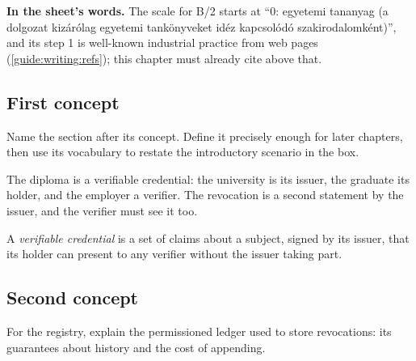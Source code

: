 \textbf{In the sheet's words.} The scale for B/2 starts at \enquote{0: egyetemi tananyag (a dolgozat kizárólag egyetemi tankönyveket idéz kapcsolódó szakirodalomként)}, and its step 1 is well-known industrial practice from web pages (\cref{guide:writing:refs}); this chapter must already cite above that.

\subsection[First concept]{First concept\skimmark}\label{guide:chapters:first-concept}
Name the section after its concept. Define it precisely enough for later chapters, then use its vocabulary to restate the introductory scenario in the box.
\begin{runningexample}
The diploma is a verifiable credential: the university is its \gls{issuer}, the graduate its \gls{holder}, and the employer a \gls{verifier}. The revocation is a second statement by the issuer, and the verifier must see it too.
\end{runningexample}
\begin{definition}\label{guide:def:vc}
A \emph{verifiable credential} is a set of claims about a subject, signed by its issuer, that its holder can present to any verifier without the issuer taking part.
\end{definition}

\subsection{Second concept}\label{guide:chapters:second-concept}
For the registry, explain the permissioned ledger used to store revocations: its guarantees about history and the cost of appending.

